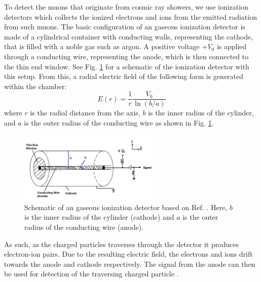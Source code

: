 \documentclass[a4paper]{report}
\numberwithin{equation}{section}
\begin{document}
To detect the muons that originate from cosmic ray showers, we use ionization detectors which collects the ionized electrons and ions 
from the emitted radiation from such muons. The basic configuration of an gaseous ionization detector is 
made of a cylindrical container with conducting walls, representing the cathode, that is filled with a noble gas such as argon. A positive voltage 
$+V_0$ is applied through a conducting wire, representing the anode, which is then connected to the thin end window.
See Fig. \ref{fig:ionization_chamber_schematic} 
for a schematic of the ionization detector with this setup. From this, a radial electric field of the following form is generated within the chamber:
\begin{equation}
	E(r) = \frac{1}{r}\frac{V_0}{\ln (b / a)}
\end{equation}
where $r$ is the radial distance from the axis, $b$ is the inner radius of the cylinder, and $a$ is the outer radius of the conducting 
wire as shown in Fig. \ref{fig:ionization_chamber_schematic}. \par 

\begin{figure}[htb!]
	\centering
	\includegraphics[width=0.6\textwidth]{ionization_chamber_schematic.png}
	\caption{Schematic of an gaseous ionization detector based on Ref. \cite{Leo1994}. Here, $b$ is the inner radius of the cylinder (cathode) and $a$ is the outer radius 
	of the conducting wire (anode).}
	\label{fig:ionization_chamber_schematic}	
\end{figure}

As such, as the charged particles traverses through the detector it produces electron-ion pairs. Due to the resulting electric field, 
the electrons and ions drift towards the anode and cathode respectively. The signal from the anode can then be used for detection of the 
traversing charged particle \cite{Leo1994}. \par 
\end{document}
